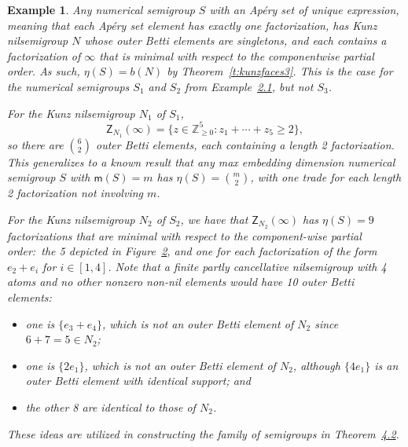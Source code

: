 \documentclass[10pt,a4paper]{amsart}
\newcommand\ZZ{\mathbb{Z}}
\newtheorem{exam}[thm]{Example}
\begin{document}
\setcounter{thm}{4}
\begin{exam}\label{e:outerbettis}
Any numerical semigroup $S$ with an \emph{Ap\'ery set of unique expression}, meaning that each Ap\'ery set element has exactly one factorization, has Kunz nilsemigroup $N$ whose outer Betti elements are singletons, and each contains a factorization of $\infty$ that is minimal with respect to the componentwise partial order. As such, $\eta(S) = b(N)$ by Theorem~\ref{t:kunzfaces3}.  
This is the case for the numerical semigroups $S_1$ and $S_2$ from Example~\href{https://alco.centre-mersenne.org/articles/10.5802/alco.354/}{2.1}, but not $S_3$.  

For the Kunz nilsemigroup $N_1$ of $S_1$, 
$$\mathsf Z_{N_1}(\infty) = \{z \in \ZZ_{\ge 0}^5 : z_1 + \cdots + z_5 \ge 2\},$$
so there are $\binom{6}{2}$ outer Betti elements, each containing a length 2 factorization.  
This generalizes to a known result that any max embedding dimension numerical semigroup $S$ with $\mathsf m(S) = m$ has $\eta(S) = \binom{m}{2}$, with one trade for each length 2 factorization not involving $m$.  

For the Kunz nilsemigroup $N_2$ of $S_2$, we have that $\mathsf Z_{N_2}(\infty)$ has $\eta(S) = 9$ factorizations that are minimal with respect to the component-wise partial order:\ the 5 depicted in Figure~\href{https://alco.centre-mersenne.org/articles/10.5802/alco.354/}{2}, and one for each factorization of the form $e_2 + e_i$ for $i \in [1,4]$.  Note that a finite partly cancellative nilsemigroup with 4 atoms and no other nonzero non-nil elements would have 10 outer Betti elements:\ 
\begin{itemize}
\item
one is $\{e_3 + e_4\}$, which is not an outer Betti element of $N_2$ since $6 + 7 = 5 \in N_2$;

\item
one is $\{2e_1\}$, which is not an outer Betti element of $N_2$, although $\{4e_1\}$ is an outer Betti element with identical support; and

\item
the other 8 are identical to those of $N_2$.  

\end{itemize}
These ideas are utilized in constructing the family of semigroups in Theorem~\href{https://alco.centre-mersenne.org/articles/10.5802/alco.354/}{4.2}.  


\end{exam}
\end{document}
